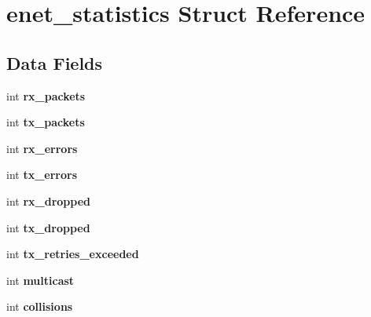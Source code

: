 \hypertarget{structenet__statistics}{}\section{enet\+\_\+statistics Struct Reference}
\label{structenet__statistics}
\subsection*{Data Fields}
\begin{DoxyCompactItemize}
\item 
\mbox{\label{structenet__statistics_afa298a0811753981bae93cca6f95312c}} 
int {\bfseries rx\+\_\+packets}
\item 
\mbox{\label{structenet__statistics_ad14eea340f4503ce44c2ddae7ce3aa74}} 
int {\bfseries tx\+\_\+packets}
\item 
\mbox{\label{structenet__statistics_a409c114ae3ca570fae8c57d30171116f}} 
int {\bfseries rx\+\_\+errors}
\item 
\mbox{\label{structenet__statistics_a747309983e5f52f2f5b1cfba13c8b8df}} 
int {\bfseries tx\+\_\+errors}
\item 
\mbox{\label{structenet__statistics_a257946db197153739f3b0e9852627dfa}} 
int {\bfseries rx\+\_\+dropped}
\item 
\mbox{\label{structenet__statistics_a6fed19beb29b8b3d1444086e274b1f78}} 
int {\bfseries tx\+\_\+dropped}
\item 
\mbox{\label{structenet__statistics_a52b8670d247710b24e8bfed550b0d385}} 
int {\bfseries tx\+\_\+retries\+\_\+exceeded}
\item 
\mbox{\label{structenet__statistics_a38524c22b7d2511fe56bcee44ced6e15}} 
int {\bfseries multicast}
\item 
\mbox{\label{structenet__statistics_a607541700797e9617a103e82ab46492e}} 
int {\bfseries collisions}
\item 

\end{DoxyCompactItemize}
